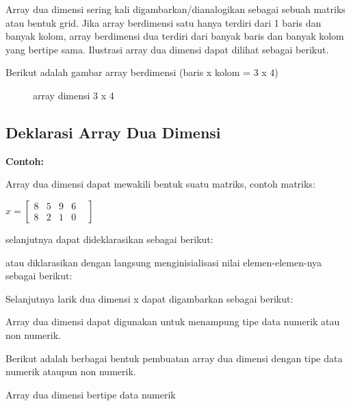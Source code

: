 Array dua dimensi sering kali digambarkan/dianalogikan sebagai sebuah
matriks atau bentuk grid. Jika array berdimensi satu hanya terdiri dari
1 baris dan banyak kolom, array berdimensi dua terdiri dari banyak baris
dan banyak kolom yang bertipe sama. Ilustrasi array dua dimensi dapat
dilihat sebagai berikut.

Berikut adalah gambar array berdimensi (baris x kolom = 3 x 4)

\begin{figure}[htbp]
\centering
{}
\label{gambar3-3}
\caption{array dimensi 3 x 4}
\end{figure}

\subsection{Deklarasi Array Dua Dimensi}\label{deklarasi-array-dua-dimensi}



\textbf{Contoh:}



Array dua dimensi dapat mewakili bentuk suatu matriks, contoh matriks:


$x=
\begin{bmatrix}
8 &5& 9 & 6 & \\
8 & 2 & 1 & 0
\end{bmatrix}$

selanjutnya dapat dideklarasikan sebagai berikut:



atau diklarasikan dengan langsung menginisialisasi nilai
elemen-elemen-nya sebagai berikut:



Selanjutnya larik dua dimensi x dapat digambarkan sebagai berikut:



Array dua dimensi dapat digunakan untuk menampung tipe data numerik atau
non numerik.

Berikut adalah berbagai bentuk pembuatan array dua dimensi dengan tipe
data numerik ataupun non numerik.

Array dua dimensi bertipe data numerik

